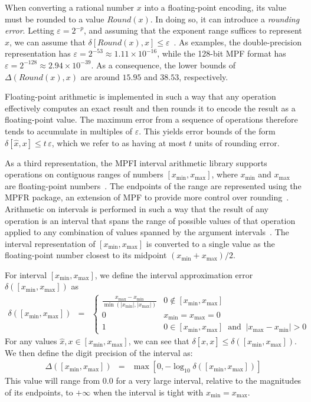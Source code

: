 \documentclass[letterpaper,USenglish,cleveref, autoref, thm-restate]{lipics-v2021}
\newcommand{\approximate}[1]{\hat{#1}}
\newcommand{\approxx}{\approximate{x}}
\newcommand{\round}{\mathit{Round}}
\newcommand{\aerror}{\delta}
\newcommand{\digitprecision}{\Delta}
\newcommand{\roundepsilon}{\varepsilon}
\newcommand{\xmin}{x_{\textrm{min}}}
\newcommand{\xmax}{x_{\textrm{max}}}
\begin{document}
When converting a rational number $x$ into a floating-point encoding, its value must be rounded to a
value $\round(x)$.  In doing so, it can introduce a \emph{rounding
error}.  
Letting $\roundepsilon = 2^{-p}$, and assuming that
the exponent range suffices to represent $x$,
we can assume that
$\aerror[\round(x), x] \leq \roundepsilon$~\cite{muller:hfpa:2018,knuth:fp:1981}.
As examples, the double-precision representation has $\roundepsilon = 2^{-53} \approx 1.11 \times 10^{-16}$, while the 128-bit MPF format
has $\roundepsilon = 2^{-128} \approx 2.94 \times 10^{-39}$.  As a consequence, the lower bounds of $\digitprecision(\round(x), x)$ are around $15.95$ and $38.53$, respectively.

Floating-point arithmetic is implemented in such a way that any
operation effectively computes an exact result and then rounds it to
encode the result as a floating-point value.  The maximum error from a sequence of operations
therefore tends to accumulate in multiples of $\roundepsilon$.
This yields error bounds of the form $\aerror[\approxx, x] \leq t\,\roundepsilon$,
which we  refer to as having at most $t$ units of
rounding error.

As a third representation, the MPFI interval arithmetic library
supports operations on
contiguous ranges of numbers $[\xmin, \xmax]$, where
$\xmin$ and $\xmax$ are floating-point numbers~\cite{revol:rc:2005}.  The endpoints of the
range are represented using the MPFR package, an extension of MPF to
provide more control over rounding~\cite{fousse:tms:2007}.  Arithmetic on intervals is performed
in such a way that the result of any operation is an interval that
spans the range of possible values of that operation applied to any
combination of values spanned by the argument intervals~\cite{hickey:jacm:2001,muller:hfpa:2018}.  The interval representation of $[\xmin, \xmax]$ is converted to
a single value as
the floating-point number closest to its midpoint $(\xmin + \xmax)/2$.

For interval $[\xmin, \xmax]$, we define the interval approximation error $\aerror([\xmin, \xmax])$ as
\begin{eqnarray}
\aerror([\xmin, \xmax]) & = & \left\{ \begin{array}{ll}
  \frac{\xmax - \xmin}{\min(|\xmin|, |\xmax|)}  & 0 \not \in [\xmin, \xmax]\\[0.8em]
  0 & \xmin = \xmax = 0 \\
  1 & 0 \in [\xmin, \xmax] \;\; \textrm{and} \;\; |\xmax - \xmin|  > 0 
  \end{array} \right. \label{eqn:interval:error}
\end{eqnarray}
For any values $\approxx, x \in [\xmin, \xmax]$, we can see that
$\aerror[\approxx, x] \leq \aerror([\xmin, \xmax])$.
We then define the digit precision of the interval as:
\begin{eqnarray}
\digitprecision([\xmin, \xmax]) & = & \max[0, -\log_{10} \aerror([\xmin, \xmax])] \label{eqn:interval:digitprecision} 
\end{eqnarray}
This value will range from $0.0$ for a very large interval, relative to the magnitudes of its endpoints, to $+\infty$ when the interval is tight with $\xmin = \xmax$.
\end{document}
